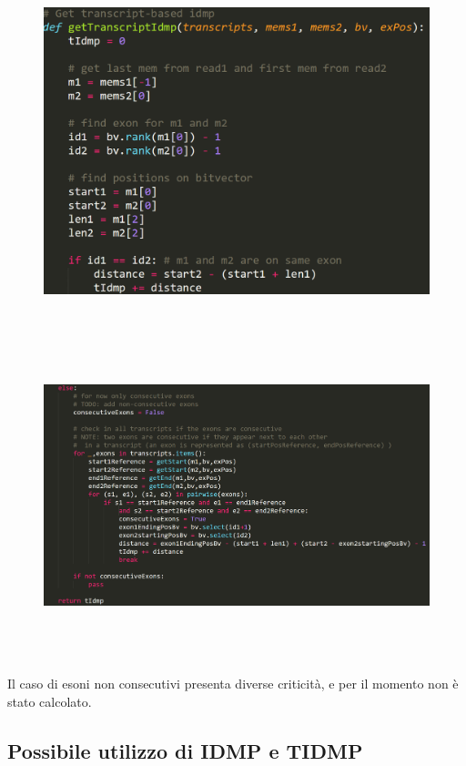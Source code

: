 \begin{figure}[h!]
	\centering
	\includegraphics[width=\linewidth, height=9.5cm]{images/gettIDMP1.png}
  \label{fig:GettIDMP}
\end{figure}

\newpage

\begin{figure}[h!]
	\centering
	\includegraphics[width=\linewidth, height=9.5cm]{images/gettIDMP2.png}
  \label{fig:GettIDMP}
\end{figure}

Il caso di esoni non consecutivi presenta diverse criticità, e per il momento non è stato calcolato.

\newpage

\subsection{Possibile utilizzo di IDMP e TIDMP}

\newpage